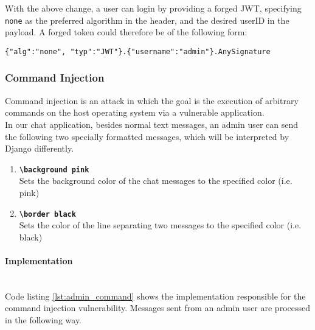 \documentclass[12pt,a4paper]{article}
\newcommand{\code}[1]{\texttt{#1}}
\begin{document}
 With the above change, a user can login by providing a forged JWT, specifying \code{none} as the preferred algorithm in the header, and the desired userID in the payload. A forged token could therefore be of the following form:
 \begin{verbatim}
{"alg":"none", "typ":"JWT"}.{"username":"admin"}.AnySignature
  \end{verbatim}

\subsubsection{Command Injection}
Command injection is an attack in which the goal is the execution of arbitrary commands on the host operating system via a vulnerable application.~\cite{owasp-cmd-inj} \\
In our chat application, besides normal text messages, an admin user can send the following two specially formatted messages, which will be interpreted by Django differently.
\begin{enumerate}
\item \textbf{\code{\textbackslash background pink} } \\
Sets the background color of the chat messages to the specified color (i.e. pink)
\item \textbf{\code{\textbackslash border black} } \\
Sets the color of the line separating two messages to the specified color (i.e. black) 
\end{enumerate}


\paragraph{Implementation}

\noindent \\Code listing \ref{lst:admin_command} shows the implementation responsible for the command injection vulnerability. Messages sent from an admin user are processed in the following way.
\end{document}
